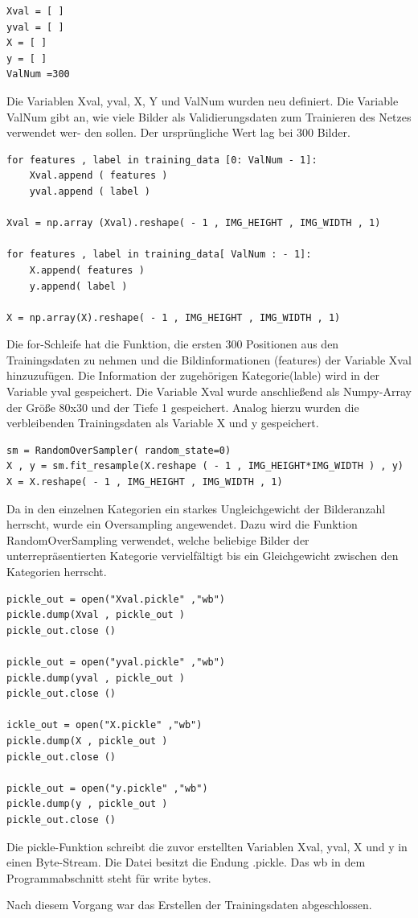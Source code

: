 \begin{lstlisting}
Xval = [ ]
yval = [ ]
X = [ ]
y = [ ]
ValNum =300
\end{lstlisting}

Die Variablen Xval, yval, X, Y und ValNum wurden neu definiert. Die Variable ValNum
gibt an, wie viele Bilder als Validierungsdaten zum Trainieren des Netzes verwendet wer-
den sollen. Der ursprüngliche Wert lag bei 300 Bilder.


\begin{lstlisting}
for features , label in training_data [0: ValNum - 1]:
    Xval.append ( features )
    yval.append ( label )
    
Xval = np.array (Xval).reshape( - 1 , IMG_HEIGHT , IMG_WIDTH , 1)

for features , label in training_data[ ValNum : - 1]:
    X.append( features )
    y.append( label )

X = np.array(X).reshape( - 1 , IMG_HEIGHT , IMG_WIDTH , 1)
\end{lstlisting}


Die for-Schleife hat die Funktion, die ersten 300 Positionen aus den Trainingsdaten zu
nehmen und die Bildinformationen (features) der Variable Xval hinzuzufügen. Die 
Information der zugehörigen Kategorie(lable) wird in der Variable yval gespeichert. Die
Variable Xval wurde anschließend als Numpy-Array der Größe 80x30 und der Tiefe 1
gespeichert. Analog hierzu wurden die verbleibenden Trainingsdaten als Variable X und
y gespeichert.

\begin{lstlisting}
sm = RandomOverSampler( random_state=0)
X , y = sm.fit_resample(X.reshape ( - 1 , IMG_HEIGHT*IMG_WIDTH ) , y)
X = X.reshape( - 1 , IMG_HEIGHT , IMG_WIDTH , 1)
\end{lstlisting}


Da in den einzelnen Kategorien ein starkes Ungleichgewicht der Bilderanzahl herrscht,
wurde ein Oversampling angewendet. Dazu wird die Funktion RandomOverSampling verwendet,
welche beliebige Bilder der unterrepräsentierten Kategorie vervielfältigt bis ein
Gleichgewicht zwischen den Kategorien herrscht.


\begin{lstlisting}
pickle_out = open("Xval.pickle" ,"wb")
pickle.dump(Xval , pickle_out )
pickle_out.close ()

pickle_out = open("yval.pickle" ,"wb")
pickle.dump(yval , pickle_out )
pickle_out.close ()

ickle_out = open("X.pickle" ,"wb")
pickle.dump(X , pickle_out )
pickle_out.close ()

pickle_out = open("y.pickle" ,"wb")
pickle.dump(y , pickle_out )
pickle_out.close ()
\end{lstlisting}

Die pickle-Funktion schreibt die zuvor erstellten Variablen Xval, yval, X und y in einen
Byte-Stream. Die Datei besitzt die Endung .pickle. Das wb in dem Programmabschnitt
steht für write bytes.

Nach diesem Vorgang war das Erstellen der Trainingsdaten abgeschlossen.
